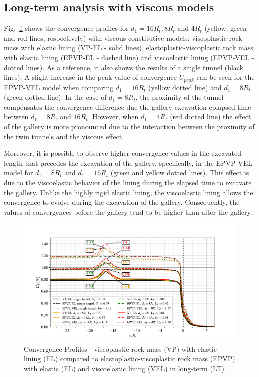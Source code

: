 \documentclass[a4paper,fleqn]{cas-sc}
\begin{document}
\subsection{Long-term analysis with viscous models}\label{}

Fig.~\ref{VP-EL-EPVP-VEL-WG-LT} shows the convergence profiles for $d_1 = 16R_t, 8R_t$ and $4R_t$ (yellow, green and red lines, respectively) with viscous constitutive models: viscoplastic rock mass with elastic lining (VP-EL - solid lines), elastoplastic-viscoplastic rock mass with elastic lining (EPVP-EL - dashed line) and viscoelastic lining (EPVP-VEL - dotted lines). As a reference, it also shows the results of a single tunnel (black lines). A slight increase in the peak value of convergence $U_{peak}$ can be seen for the EPVP-VEL model when comparing $d_1 = 16R_t$ (yellow dotted line) and $d_1 = 8R_t$ (green dotted line). In the case of $d_1 = 8R_t$, the proximity of the tunnel compensates the convergence difference due the gallery excavation eplapsed time between $d_1 = 8R_t$ and $16 R_t$. However, when $d_1 = 4R_t$ (red  dotted line) the effect of the gallery is more pronounced due to the interaction between the proximity of the twin tunnels and the viscous effect. 

Moreover, it is possible to observe higher convergence values in the excavated length that precedes the excavation of the gallery, specifically, in the EPVP-VEL model for $d_1 = 8R_t$ and $d_1 = 16R_t$ (green and yellow dotted lines). This effect is due to the viscoelastic behavior of the lining during the elapsed time to excavate the gallery. Unlike the highly rigid elastic lining, the viscoelastic lining allows the convergence to evolve during the excavation of the gallery. Consequently, the values of convergences before the gallery tend to be higher than after the gallery.

\begin{figure}[h!]
	\centering
	\includegraphics[scale=0.9]{Convergence Profiles - VP_EPVP_EL_VEL_WG_LT_anotate.pdf}
	\caption{Convergence Profiles - viscoplastic rock mass (VP) with elastic lining (EL) compared to elastoplastic-viscoplastic rock mass (EPVP) with elastic (EL) and viscoelastic lining (VEL) in long-term (LT).}
	\label{VP-EL-EPVP-VEL-WG-LT}
\end{figure}
\FloatBarrier
\end{document}
